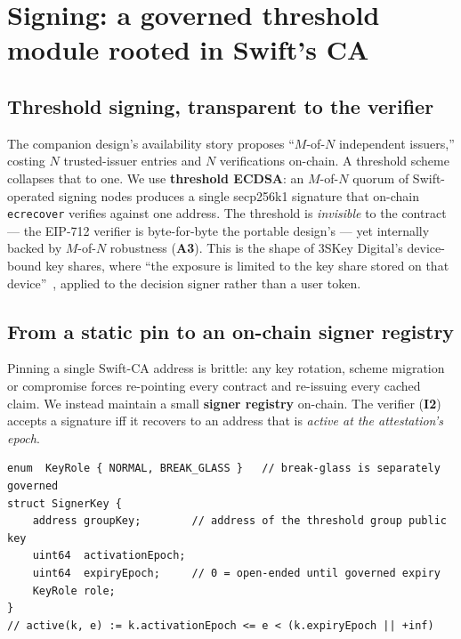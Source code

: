 \documentclass[11pt,a4paper]{article}
\newcommand{\Aref}[1]{\textbf{A#1}}
\newcommand{\Iref}[1]{\textbf{I#1}}
\begin{document}
\section{Signing: a governed threshold module rooted in Swift's CA}
\label{sec:signing}

\subsection{Threshold signing, transparent to the verifier}
The companion design's availability story proposes ``$M$-of-$N$ independent
issuers,'' costing $N$ trusted-issuer entries and $N$ verifications on-chain. A
threshold scheme collapses that to one. We use \textbf{threshold ECDSA}: an
$M$-of-$N$ quorum of Swift-operated signing nodes produces a single secp256k1
signature that on-chain \texttt{ecrecover} verifies against one address. The
threshold is \emph{invisible} to the contract --- the EIP-712 verifier is
byte-for-byte the portable design's --- yet internally backed by $M$-of-$N$
robustness (\Aref{3}). This is the shape of 3SKey Digital's device-bound key
shares, where ``the exposure is limited to the key share stored on that
device''~\cite{swift3skeyfs}, applied to the decision signer rather than a user
token.

\subsection{From a static pin to an on-chain signer registry}
Pinning a single Swift-CA address is brittle: any key rotation, scheme migration
or compromise forces re-pointing every contract and re-issuing every cached
claim. We instead maintain a small \textbf{signer registry} on-chain. The
verifier (\Iref{2}) accepts a signature iff it recovers to an address that is
\emph{active at the attestation's epoch}.

\begin{lstlisting}[caption={On-chain signer registry. Rotation and compromise
response become governed actions with an overlap window, not a redeploy.},captionpos=b]
enum  KeyRole { NORMAL, BREAK_GLASS }   // break-glass is separately governed
struct SignerKey {
    address groupKey;        // address of the threshold group public key
    uint64  activationEpoch;
    uint64  expiryEpoch;     // 0 = open-ended until governed expiry
    KeyRole role;
}
// active(k, e) := k.activationEpoch <= e < (k.expiryEpoch || +inf)
\end{lstlisting}
\end{document}
